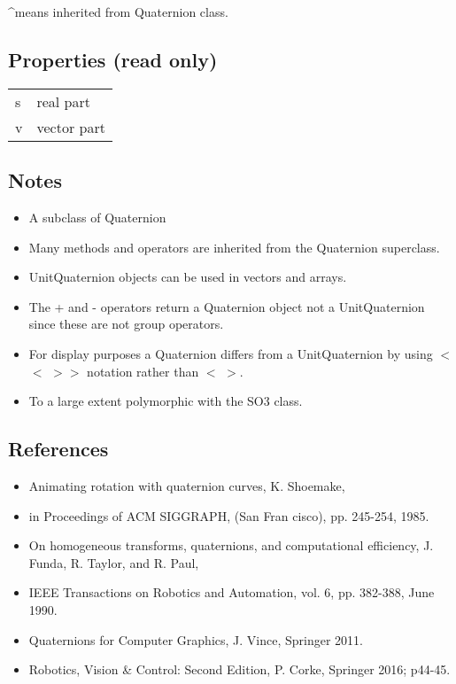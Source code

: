 \textasciicircum  means inherited from Quaternion class.


\subsection*{Properties (read only)}
\begin{longtable}{lp{120mm}}
s & real part\\ 
v & vector part\\ 
\end{longtable}\vspace{1ex}

\subsection*{Notes}
\begin{itemize}
  \item A subclass of Quaternion
  \item Many methods and operators are inherited from the Quaternion superclass.
  \item UnitQuaternion objects can be used in vectors and arrays.
  \item The + and - operators return a Quaternion object not a UnitQuaternion    since these are not group operators.
  \item For display purposes a Quaternion differs from a UnitQuaternion by    using $<$$<$ $>$$>$ notation rather than $<$ $>$.
  \item To a large extent polymorphic with the SO3 class.
\end{itemize}

\subsection*{References}
\begin{itemize}
  \item Animating rotation with quaternion curves,    K. Shoemake,
  \item in Proceedings of ACM SIGGRAPH, (San Fran cisco), pp. 245-254, 1985.
  \item On homogeneous transforms, quaternions, and computational efficiency,    J. Funda, R. Taylor, and R. Paul,
  \item IEEE Transactions on Robotics and Automation, vol. 6, pp. 382-388, June 1990.
  \item Quaternions for Computer Graphics, J. Vince, Springer 2011.
  \item Robotics, Vision \& Control: Second Edition, P. Corke, Springer 2016; p44-45.
\end{itemize}

